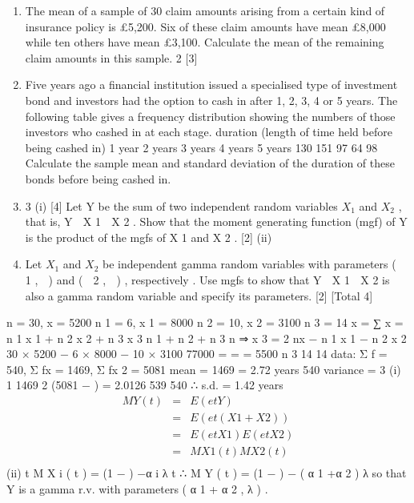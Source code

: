 \documentclass[a4paper,12pt]{article}
\begin{document}
\begin{enumerate} 
\item The mean of a sample of 30 claim amounts arising from a certain kind of insurance
policy is £5,200. Six of these claim amounts have mean £8,000 while ten others have mean £3,100.
Calculate the mean of the remaining claim amounts in this sample.
2
[3]
\item Five years ago a financial institution issued a specialised type of investment bond and investors had the option to cash in after 1, 2, 3, 4 or 5 years. The following table gives a frequency distribution showing the numbers of those investors who cashed in
at each stage.
duration (length of time held before being cashed in)
1 year
2 years
3 years
4 years
5 years
130
151
97
64
98
Calculate the sample mean and standard deviation of the duration of these bonds before being cashed in.

\item 3
(i)
[4]
Let Y be the sum of two independent random variables $X_1$ and $X_2$ , that is,
Y  X 1  X 2 .
Show that the moment generating function (mgf) of Y is the product of the
mgfs of X 1 and X 2 .
[2]
(ii)
\item Let $X_1$ and $X_2$ be independent gamma random variables with parameters
(  1 ,  ) and (  2 ,  ) , respectively .
Use mgfs to show that Y  X 1  X 2 is also a gamma random variable and
specify its parameters.
[2]
[Total 4]

\end{enumerate}

n = 30, x = 5200
n 1 = 6, x 1 = 8000
n 2 = 10, x 2 = 3100
n 3 = 14
x =
∑ x = n 1 x 1 + n 2 x 2 + n 3 x 3
n 1 + n 2 + n 3
n
⇒ x 3 =
2
nx − n 1 x 1 − n 2 x 2 30 × 5200 − 6 × 8000 − 10 × 3100 77000
=
=
= 5500
n 3
14
14
data: Σ f = 540, Σ fx = 1469, Σ fx 2 = 5081
mean =
1469
= 2.72 years
540
variance =
3
(i)
1
1469 2
(5081 −
) = 2.0126
539
540
∴ s.d. = 1.42 years
\begin{eqnarray*}
M Y ( t ) &=& E ( e tY ) \\ &=& E ( e t ( X 1 + X 2 ) )
\\ &=& E ( e tX 1 ) E ( e tX 2 ) \\ &=& M X 1 ( t ) M X 2 ( t )\\
\end{eqnarray*}
(ii)
t
M X i ( t ) = (1 − ) −α i
λ
t
∴ M Y ( t ) = (1 − ) − ( α 1 +α 2 )
λ
so that Y is a gamma r.v. with parameters ( α 1 + α 2 , λ ) .


\end{document}
